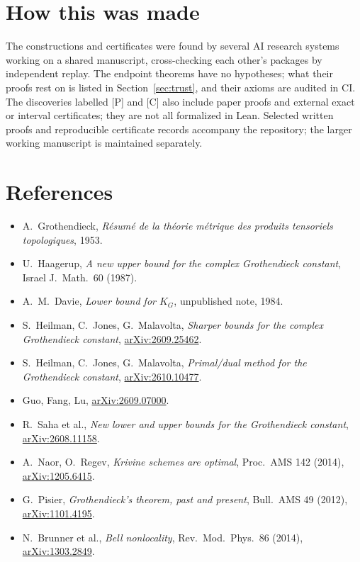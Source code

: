 \documentclass[11pt,a4paper]{article}
\begin{document}
\section*{How this was made}
The constructions and certificates were found by several AI research systems working on a shared manuscript, cross-checking
each other's packages by independent replay. The endpoint theorems have no hypotheses; what their proofs rest on is
listed in Section~\ref{sec:trust}, and their axioms are audited in CI. The discoveries labelled [P] and [C] also include paper proofs
and external exact or interval certificates; they are not all formalized in Lean. Selected written proofs and reproducible certificate records accompany the repository; the larger working manuscript is maintained separately.

\clearpage
\section*{References}
\small\sloppy
\begin{itemize}
\item A.~Grothendieck, \emph{R\'esum\'e de la th\'eorie m\'etrique des produits tensoriels topologiques}, 1953.
\item U.~Haagerup, \emph{A new upper bound for the complex Grothendieck constant}, Israel J.\ Math.\ 60 (1987).
\item A.~M.~Davie, \emph{Lower bound for $K_G$}, unpublished note, 1984.
\item S.~Heilman, C.~Jones, G.~Malavolta, \emph{Sharper bounds for the complex Grothendieck constant},
 \href{https://arxiv.org/abs/2609.25462}{arXiv:2609.25462}.
\item S.~Heilman, C.~Jones, G.~Malavolta, \emph{Primal/dual method for the Grothendieck constant},
 \href{https://arxiv.org/abs/2610.10477}{arXiv:2610.10477}.
\item Guo, Fang, Lu, \href{https://arxiv.org/abs/2609.07000}{arXiv:2609.07000}.
\item R.~Saha et al., \emph{New lower and upper bounds for the Grothendieck constant},
 \href{https://arxiv.org/abs/2608.11158}{arXiv:2608.11158}.
\item A.~Naor, O.~Regev, \emph{Krivine schemes are optimal}, Proc.\ AMS 142 (2014),
 \href{https://arxiv.org/abs/1205.6415}{arXiv:1205.6415}.
\item G.~Pisier, \emph{Grothendieck's theorem, past and present}, Bull.\ AMS 49 (2012),
 \href{https://arxiv.org/abs/1101.4195}{arXiv:1101.4195}.
\item N.~Brunner et al., \emph{Bell nonlocality}, Rev.\ Mod.\ Phys.\ 86 (2014),
 \href{https://arxiv.org/abs/1303.2849}{arXiv:1303.2849}.
\end{itemize}
\end{document}
